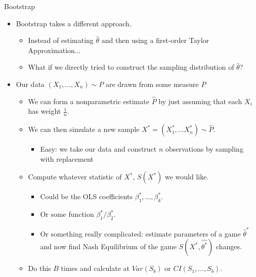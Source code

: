 \documentclass[aspectratio=169]{beamer}
\begin{document}
\begin{frame}{Bootstrap}
\begin{itemize}
\item Bootstrap takes a different approach.
\begin{itemize}
\item Instead of estimating $\hat{\theta}$ and then using a first-order Taylor Approximation...
\item What if we directly tried to construct the \alert{sampling distribution} of $\hat{\theta}$?
\end{itemize}
\item Our data $(X_1,\ldots,X_n) \sim P$ are drawn from some measure $P$
\begin{itemize}
\item We can form a \alert{nonparametric estimate} $\hat{P}$ by just assuming that each $X_i$ has weight $\frac{1}{n}$.
\item We can then simulate a new sample $X^{*} = (X_1^{*},\ldots X_n^{*}) \sim \hat{P}$.
\begin{itemize}
\item Easy: we take our data and construct $n$ observations by \alert{sampling with replacement} 
\end{itemize}
\item Compute whatever statistic of $X^{*}$, $S(X^*)$ we would like.
\begin{itemize}
\item Could be the OLS coefficients $\beta_1^{*},\ldots, \beta_k^{*}$.
\item Or some function $\beta_1^{*}/\beta_2^{*}$.
\item Or something really complicated: estimate parameters of a game $\hat{\theta}^*$ and now find Nash Equilibrium of the game $S(X^{*},\hat{\theta^*})$ changes.
\end{itemize}
\item Do this $B$ times and calculate at $Var(S_b)$ or $CI(S_1,\ldots, S_b)$.
\end{itemize}
\end{itemize}
\end{frame}
\end{document}
